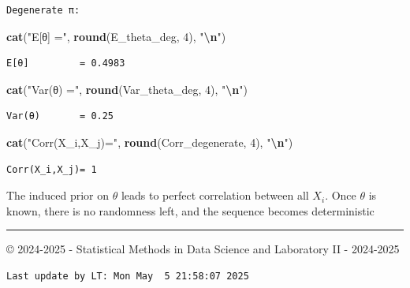 \documentclass[
]{article}
\newenvironment{Shaded}{\begin{snugshade}}{\end{snugshade}}
\newcommand{\DecValTok}[1]{\textcolor[rgb]{0.00,0.00,0.81}{#1}}
\newcommand{\FunctionTok}[1]{\textcolor[rgb]{0.13,0.29,0.53}{\textbf{#1}}}
\newcommand{\NormalTok}[1]{#1}
\newcommand{\SpecialCharTok}[1]{\textcolor[rgb]{0.81,0.36,0.00}{\textbf{#1}}}
\newcommand{\StringTok}[1]{\textcolor[rgb]{0.31,0.60,0.02}{#1}}
\begin{document}
\begin{verbatim}
Degenerate π:
\end{verbatim}

\begin{Shaded}
\begin{Highlighting}[]
\FunctionTok{cat}\NormalTok{(}\StringTok{"E[θ]         ="}\NormalTok{, }\FunctionTok{round}\NormalTok{(E\_theta\_deg, }\DecValTok{4}\NormalTok{), }\StringTok{"}\SpecialCharTok{\textbackslash{}n}\StringTok{"}\NormalTok{)}
\end{Highlighting}
\end{Shaded}

\begin{verbatim}
E[θ]         = 0.4983 
\end{verbatim}

\begin{Shaded}
\begin{Highlighting}[]
\FunctionTok{cat}\NormalTok{(}\StringTok{"Var(θ)       ="}\NormalTok{, }\FunctionTok{round}\NormalTok{(Var\_theta\_deg, }\DecValTok{4}\NormalTok{), }\StringTok{"}\SpecialCharTok{\textbackslash{}n}\StringTok{"}\NormalTok{)}
\end{Highlighting}
\end{Shaded}

\begin{verbatim}
Var(θ)       = 0.25 
\end{verbatim}

\begin{Shaded}
\begin{Highlighting}[]
\FunctionTok{cat}\NormalTok{(}\StringTok{"Corr(X\_i,X\_j)="}\NormalTok{, }\FunctionTok{round}\NormalTok{(Corr\_degenerate, }\DecValTok{4}\NormalTok{), }\StringTok{"}\SpecialCharTok{\textbackslash{}n}\StringTok{"}\NormalTok{)}
\end{Highlighting}
\end{Shaded}

\begin{verbatim}
Corr(X_i,X_j)= 1 
\end{verbatim}

The induced prior on \(\theta\) leads to perfect correlation between all
\(X_i\). Once \(\theta\) is known, there is no randomness left, and the
sequence becomes deterministic

\vspace{10.5cm}

\begin{center}\rule{0.5\linewidth}{0.5pt}\end{center}

© 2024-2025 - Statistical Methods in Data Science and Laboratory II -
2024-2025

\begin{verbatim}
Last update by LT: Mon May  5 21:58:07 2025
\end{verbatim}
\end{document}
